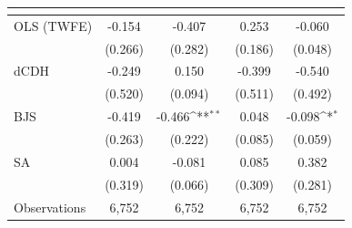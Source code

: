 {
\def\sym#1{\ifmmode^{#1}\else\(^{#1}\)\fi}
\begin{tabular}{l*{4}{c}}
\toprule
            &&&&\\
\midrule
OLS (TWFE) & -0.154 & -0.407 & 0.253 & -0.060 \\
             & (0.266) & (0.282) & (0.186) & (0.048) \\
dCDH & -0.249 & 0.150 & -0.399 & -0.540 \\
             & (0.520) & (0.094) & (0.511) & (0.492) \\
BJS & -0.419 & -0.466\sym{**} & 0.048 & -0.098\sym{*} \\
             & (0.263) & (0.222) & (0.085) & (0.059) \\
SA & 0.004 & -0.081 & 0.085 & 0.382 \\
             & (0.319) & (0.066) & (0.309) & (0.281) \\
\midrule
Observations & 6,752 & 6,752 & 6,752 & 6,752 \\
\bottomrule
\end{tabular}
}
